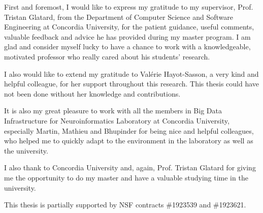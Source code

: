 \begin{acknowledgments}

First and foremost, I would like to express my gratitude to my supervisor, 
Prof. Tristan Glatard, from the Department of Computer Science and Software Engineering
at Concordia University, for the patient guidance, useful comments, valuable feedback 
and advice he has provided during my master program. 
I am glad and consider myself lucky to have a chance to work with a knowledgeable, 
motivated professor who really cared about his students' research. 

I also would like to extend my gratitude to Val\'erie Hayot-Sasson, a very kind and 
helpful colleague, for her support throughout this research. This thesis could have 
not been done without her knowledge and contributions. 

It is also my great pleasure to work with all the members in Big Data Infrastructure 
for Neuroinformatics Laboratory at Concordia University, especially Martin, Mathieu and 
Bhupinder for being nice and helpful colleagues, who helped me to quickly adapt to 
the environment in the laboratory as well as the university. 

I also thank to Concordia University and, again, Prof. Tristan Glatard for giving me the 
opportunity to do my master and have a valuable studying time in the university.

This thesis is partially supported by NSF contracts \#1923539 and \#1923621.

\end{acknowledgments}